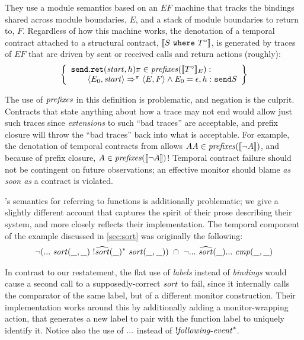 %
They use a module semantics based on an $\mathit{EF}$ machine that tracks the bindings shared across module boundaries, $E$, and a stack of module boundaries to return to, $F$.
%
Regardless of how this machine works, the denotation of a temporal contract attached to a structural contract, $[\![ S\ {\tt where}\ T^\circ ]\!]$, is generated by traces of $\mathit{EF}$ that are driven by sent or received calls and return actions (roughly):
\begin{align*}
 \left\{
   \begin{array}{l}
    {\tt send.ret}(\mathit{start},h)\pi \in \mathit{prefixes}([\![ T^\circ ]\!]_{E}) :
 \\ \qquad\langle E_0, \mathit{start}\rangle \Rightarrow^\pi \langle E, F\rangle \wedge E_0 = \epsilon, h : {\tt send}S
\end{array}\right\}
\end{align*}

The use of $\mathit{prefixes}$ in this definition is problematic, and negation is the culprit.
%
Contracts that state anything about how a trace may not end would allow just such traces since \emph{extensions} to such ``bad traces'' are acceptable, and prefix closure will throw the ``bad traces'' back into what is acceptable.
%
%
For example, the denotation of temporal contracts from \dfm{} allows $AA \in \mathit{prefixes}([\![ \neg A ]\!])$, and because of prefix closure, $A \in \mathit{prefixes}([\![ \neg A ]\!])$!
%
Temporal contract failure should not be contingent on future observations; an effective monitor should blame \emph{as soon as} a contract is violated.

\dfm's semantics for referring to functions is additionally problematic; we give a slightly different account that captures the spirit of their prose describing their system, and more closely reflects their implementation.
%
The temporal component of the example discussed in \autoref{sec:sort} was originally the following:
\begin{align*}
 \neg ({\tt ...}~ \mathit{sort}(\_,\_)~ ! \widehat{\mathit{sort}}(\_)^*~ \mathit{sort}(\_,\_)) 
 \ \cap\  \neg {\tt ...}~ \widehat{\mathit{sort}}(\_) {\tt ...}~ \mathit{cmp}(\_,\_)
\end{align*}

In contrast to our restatement, the flat use of \emph{labels} instead of \emph{bindings} would cause a second call to a supposedly-correct $\mathit{sort}$ to fail, since it internally calls the comparator of the same label, but of a different monitor construction.
%
Their implementation works around this by additionally adding a monitor-wrapping action, that generates a new label to pair with the function label to uniquely identify it.
%
Notice also the use of ${\tt ...}$ instead of $! \mathit{following\text{-}event}^*$.

